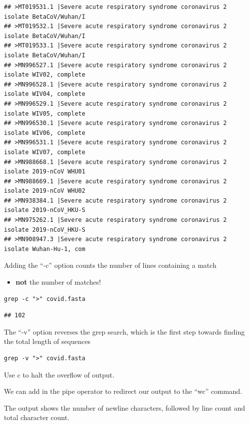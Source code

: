 \documentclass[
]{book}
\providecommand{\tightlist}{%
  \setlength{\itemsep}{0pt}\setlength{\parskip}{0pt}}
\begin{document}
\begin{verbatim}
## >MT019531.1 |Severe acute respiratory syndrome coronavirus 2 isolate BetaCoV/Wuhan/I
## >MT019532.1 |Severe acute respiratory syndrome coronavirus 2 isolate BetaCoV/Wuhan/I
## >MT019533.1 |Severe acute respiratory syndrome coronavirus 2 isolate BetaCoV/Wuhan/I
## >MN996527.1 |Severe acute respiratory syndrome coronavirus 2 isolate WIV02, complete
## >MN996528.1 |Severe acute respiratory syndrome coronavirus 2 isolate WIV04, complete
## >MN996529.1 |Severe acute respiratory syndrome coronavirus 2 isolate WIV05, complete
## >MN996530.1 |Severe acute respiratory syndrome coronavirus 2 isolate WIV06, complete
## >MN996531.1 |Severe acute respiratory syndrome coronavirus 2 isolate WIV07, complete
## >MN988668.1 |Severe acute respiratory syndrome coronavirus 2 isolate 2019-nCoV WHU01
## >MN988669.1 |Severe acute respiratory syndrome coronavirus 2 isolate 2019-nCoV WHU02
## >MN938384.1 |Severe acute respiratory syndrome coronavirus 2 isolate 2019-nCoV_HKU-S
## >MN975262.1 |Severe acute respiratory syndrome coronavirus 2 isolate 2019-nCoV_HKU-S
## >MN908947.3 |Severe acute respiratory syndrome coronavirus 2 isolate Wuhan-Hu-1, com
\end{verbatim}

Adding the ``-c'' option counts the number of lines containing a match

\begin{itemize}
\tightlist
\item
  \textbf{not} the number of matches!
\end{itemize}

\begin{verbatim}
grep -c ">" covid.fasta
\end{verbatim}

\begin{verbatim}
## 102
\end{verbatim}

The ``-v'' option reverses the grep search, which is the first step towards finding the total length of sequences

\begin{verbatim}
grep -v ">" covid.fasta
\end{verbatim}

Use c to halt the overflow of output.

We can add in the pipe operator to redirect our output to the ``wc'' command.

The output shows the number of newline characters, followed by line count and total character count.
\end{document}

